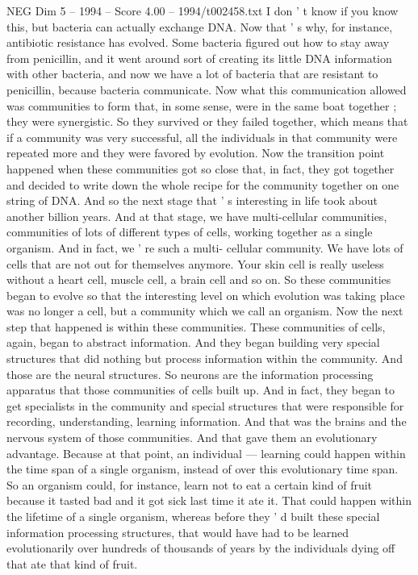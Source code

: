\begin{textsample}{NEG Dim 5 – 1994 – Score 4.00 – 1994/t002458.txt}
I don ' t know if you know this, but bacteria can actually exchange DNA.
Now that ' s why, for instance, antibiotic resistance has evolved.
Some bacteria figured out how to stay away from penicillin, and it went around sort of creating its little DNA information with other bacteria, and now we have a lot of bacteria that are resistant to penicillin, because bacteria communicate.
Now what this communication allowed was communities to form that, in some sense, were in the same boat together ; they were synergistic.
So they survived or they failed together, which means that if a community was very successful, all the individuals in that community were repeated more and they were favored by evolution.
Now the transition point happened when these communities got so close that, in fact, they got together and decided to write down the whole recipe for the community together on one string of DNA.
And so the next stage that ' s interesting in life took about another billion years.
And at that stage, we have multi-cellular communities, communities of lots of different types of cells, working together as a single organism.
And in fact, we ' re such a multi- cellular community.
We have lots of cells that are not out for themselves anymore.
Your skin cell is really useless without a heart cell, muscle cell, a brain cell and so on.
So these communities began to evolve so that the interesting level on which evolution was taking place was no longer a cell, but a community which we call an organism.
Now the next step that happened is within these communities.
These communities of cells, again, began to abstract information.
And they began building very special structures that did nothing but process information within the community.
And those are the neural structures.
So neurons are the information processing apparatus that those communities of cells built up.
And in fact, they began to get specialists in the community and special structures that were responsible for recording, understanding, learning information.
And that was the brains and the nervous system of those communities.
And that gave them an evolutionary advantage.
Because at that point, an individual — learning could happen within the time span of a single organism, instead of over this evolutionary time span.
So an organism could, for instance, learn not to eat a certain kind of fruit because it tasted bad and it got sick last time it ate it.
That could happen within the lifetime of a single organism, whereas before they ' d built these special information processing structures, that would have had to be learned evolutionarily over hundreds of thousands of years by the individuals dying off that ate that kind of fruit.

\end{textsample}
